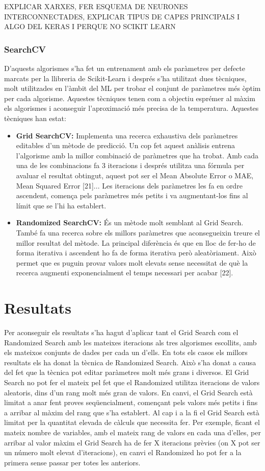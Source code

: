 \documentclass[10pt,a4paper,twocolumn,twoside]{article}
\begin{document}
EXPLICAR XARXES, FER ESQUEMA DE NEURONES INTERCONNECTADES, EXPLICAR TIPUS DE CAPES PRINCIPALS I ALGO DEL KERAS I PERQUE NO SCIKIT LEARN
\subsubsection{SearchCV}
D'aquests algorismes s'ha fet un entrenament amb els paràmetres per defecte marcats per la llibreria de Scikit-Learn i després s'ha utilitzat dues tècniques, molt utilitzades en l'àmbit del ML per trobar el conjunt de paràmetres més òptim per cada algorisme. Aquestes tècniques tenen com a objectiu esprémer al màxim els algorismes i aconseguir l'aproximació més precisa de la temperatura. Aquestes tècniques han estat:
 \begin{itemize}
\item \textbf{Grid SearchCV:} Implementa una recerca exhaustiva dels paràmetres editables d'un mètode de predicció. Un cop fet aquest anàlisis entrena l'algorisme amb la millor combinació de paràmetres que ha trobat. Amb cada una de les combinacions fa 3 iteracions i després utilitza una fórmula per avaluar el resultat obtingut, aquest pot ser el Mean Absolute Error o MAE, Mean Squared Error [21]... Les iteracions dels paràmetres les fa en ordre ascendent, comença pels paràmetres més petits i va augmentant-los fins al límit que se l'hi ha establert.
\item \textbf{Randomized SearchCV:} És un mètode molt semblant al Grid Search. També fa una recerca sobre els millors paràmetres que aconsegueixin treure el millor resultat del mètode. La principal diferència és que en lloc de fer-ho de forma iterativa i ascendent ho fa de forma iterativa però aleatòriament. Això permet que es puguin provar valors molt elevats sense necessitat de què la recerca augmenti exponencialment el temps necessari per acabar [22].
\end{itemize}
\section{Resultats}
Per aconseguir els resultats s'ha hagut d'aplicar tant el Grid Search com el Randomized Search amb les mateixes iteracions als tres algorismes escollits, amb els mateixos conjunts de dades per cada un d'ells. En tots els casos els millors resultats els ha donat la tècnica de Randomized Search. Això s'ha donat a causa del fet que la tècnica pot editar paràmetres molt més grans i diversos. El Grid Search no pot fer el mateix pel fet que el Randomized utilitza iteracions de valors aleatoris, dins d'un rang molt més gran de valors. En canvi, el Grid Search està limitat a anar fent proves seqüencialment, començant pels valors més petits i fins a arribar al màxim del rang que s'ha establert. Al cap i a la fi el Grid Search està limitat per la quantitat elevada de càlculs que necessita fer. Per exemple, ficant el mateix nombre de variables, amb el mateix rang de valors en cada una d'elles, per arribar al valor màxim el Grid Search ha de fer X iteracions prèvies (on X pot ser un número molt elevat d'iteracions), en canvi el Randomized ho pot fer a la primera sense passar per totes les anteriors.
\end{document}

